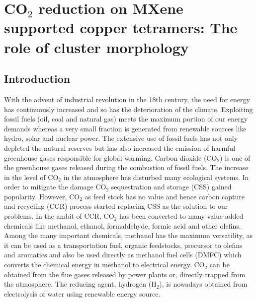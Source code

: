 \chapter{CO\texorpdfstring{$_2$}{} reduction on MXene supported copper tetramers: The role of cluster morphology }\label{appendix3}


\section{Introduction}
With the advent of industrial revolution in the 18th century, the need for energy has continuously increased and so has the deterioration of the climate. Exploiting fossil fuels (oil, coal and natural gas) meets the maximum portion of our energy demands\cite{leung2014overview} whereas a very small fraction is generated from renewable sources like hydro, solar and nuclear power. The extensive use of fossil fuels has not only depleted the natural reserves but has also increased the emission of harmful greenhouse gases responsible for global warming. Carbon dioxide (CO$_2$) is one of the greenhouse gases released during the combustion of fossil fuels. The increase in the level of CO$_2$ in the atmosphere has disturbed many ecological systems\cite{climate,cc}. In order to mitigate the damage CO$_2$ sequestration and storage (CSS) gained popularity. However, CO$_2$ as feed stock has no value and hence carbon capture and recycling (CCR) process started replacing CSS\cite{peters2009co,aresta2010carbon, aresta2007utilisation, centi2009opportunities} as the solution to our problems. In the ambit of CCR, CO$_2$ has been converted to many value added chemicals like methanol, ethanol, formaldehyde, formic acid and other olefins. Among the many important chemicals, methanol has the maximum versatility, as it can be used as a transportation fuel, organic feedstocks, precursor to olefins and aromatics and also be used directly as methanol fuel cells (DMFC) which converts the chemical energy in methanol to electrical energy\cite{mcgrath2004direct, lee1989methanol, ma2009short, liu2003recent, song2006global}. CO$_2$ can be obtained from the flue gases released by power plants or, directly trapped from the atmosphere\cite{peters2011chemical,goeppert2012air}. The reducing agent, hydrogen (H$_2$), is nowadays obtained from electrolysis of water using renewable energy source\cite{olah2013towards}. 


